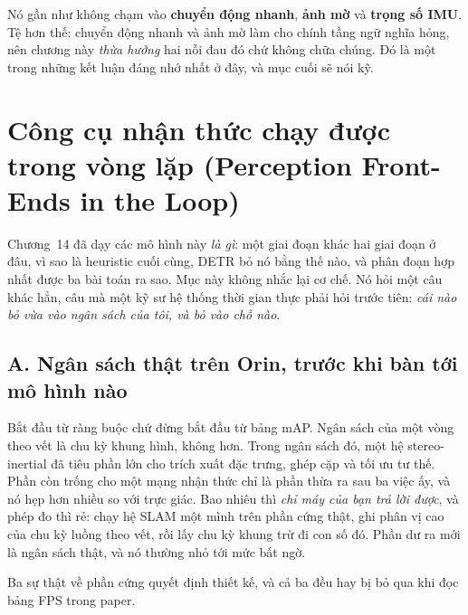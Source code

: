 \documentclass[../../deep_learning.tex]{subfiles}
\begin{document}
Nó gần như không chạm vào \textbf{chuyển động nhanh}, \textbf{ảnh mờ} và \textbf{trọng số IMU}. Tệ hơn thế: chuyển động nhanh và ảnh mờ làm cho chính tầng ngữ nghĩa hỏng, nên chương này \emph{thừa hưởng} hai nỗi đau đó chứ không chữa chúng. Đó là một trong những kết luận đáng nhớ nhất ở đây, và mục cuối sẽ nói kỹ.

\section{Công cụ nhận thức chạy được trong vòng lặp (Perception Front-Ends in the Loop)}
Chương~14 đã dạy các mô hình này \emph{là gì}: một giai đoạn khác hai giai đoạn ở đâu, vì sao  là heuristic cuối cùng, DETR bỏ nó bằng  thế nào, và phân đoạn hợp nhất được ba bài toán ra sao. Mục này không nhắc lại cơ chế. Nó hỏi một câu khác hẳn, câu mà một kỹ sư hệ thống thời gian thực phải hỏi trước tiên: \emph{cái nào bỏ vừa vào ngân sách của tôi, và bỏ vào chỗ nào}.

\subsection{A. Ngân sách thật trên Orin, trước khi bàn tới mô hình nào}
Bắt đầu từ ràng buộc chứ đừng bắt đầu từ bảng mAP. Ngân sách của một vòng theo vết là chu kỳ khung hình, không hơn. Trong ngân sách đó, một hệ stereo-inertial đã tiêu phần lớn cho trích xuất đặc trưng, ghép cặp và tối ưu tư thế. Phần còn trống cho một mạng nhận thức chỉ là phần thừa ra sau ba việc ấy, và nó hẹp hơn nhiều so với trực giác. Bao nhiêu thì \emph{chỉ máy của bạn trả lời được}, và phép đo thì rẻ: chạy hệ SLAM một mình trên phần cứng thật, ghi phân vị cao của chu kỳ luồng theo vết, rồi lấy chu kỳ khung trừ đi con số đó. Phần dư ra mới là ngân sách thật, và nó thường nhỏ tới mức bất ngờ.

Ba sự thật về phần cứng quyết định thiết kế, và cả ba đều hay bị bỏ qua khi đọc bảng FPS trong paper.
\end{document}
